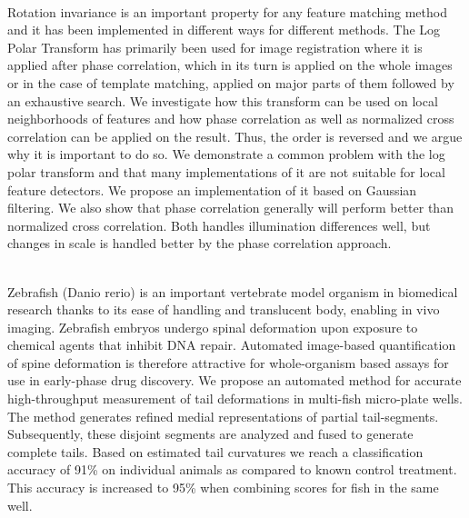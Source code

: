 {{{\begin{enumerate}
\\ \aabstract
Rotation invariance is an important property for any feature matching method and it has been implemented in different ways for different methods. The Log Polar Transform has primarily been used for image registration where it is applied after phase correlation, which in its turn is applied on the whole images or in the case of template matching, applied on major parts of them followed by an exhaustive search. We investigate how this transform can be used on local neighborhoods of features and how phase correlation as well as normalized cross correlation can be applied on the result. Thus, the order is reversed and we argue why it is important to do so. We demonstrate a common problem with the log polar transform and that many implementations of it are not suitable for local feature detectors. We propose an implementation of it based on Gaussian filtering. We also show that phase correlation generally will perform better than normalized cross correlation. Both handles illumination differences well, but changes in scale is handled better by the phase correlation approach. 

 
\\ \aabstract
Zebrafish (Danio rerio) is an important vertebrate model organism in biomedical research thanks to its ease of handling and translucent body, enabling in vivo imaging. Zebrafish embryos undergo spinal deformation upon exposure to chemical agents that inhibit DNA repair. Automated image-based quantification of spine deformation is therefore attractive for whole-organism based assays for use in early-phase drug discovery. We propose an automated method for accurate high-throughput measurement of tail deformations in multi-fish micro-plate wells. The method generates refined medial representations of partial tail-segments. Subsequently, these disjoint segments are analyzed and fused to generate complete tails. Based on estimated tail curvatures we reach a classification accuracy of 91\% on individual animals as compared to known control treatment. This accuracy is increased to 95\% when combining scores for fish in the same well.


\end{enumerate}}}}
